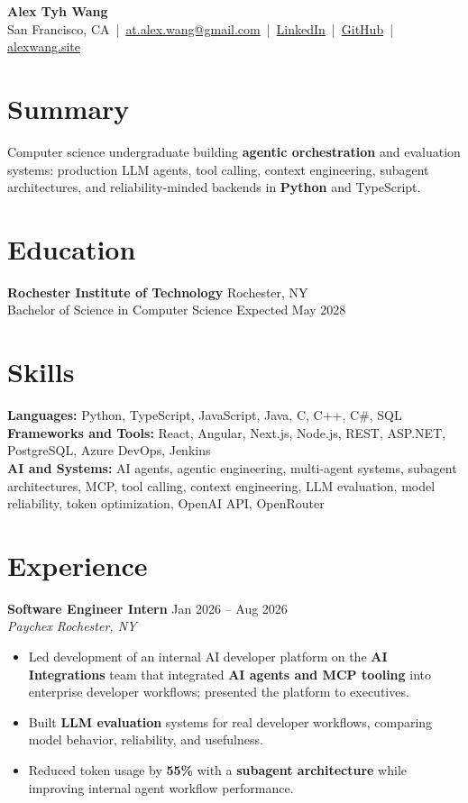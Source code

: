 \documentclass[10pt,letterpaper]{article}
\newif\ifresumeFirstRole
\newcommand{\resumeRole}[4]{%
  \ifresumeFirstRole
    \global\resumeFirstRolefalse
  \else
    \vspace{0pt plus 1fill}%
  \fi
  \textbf{#1} \hfill #2\\
  \textit{#3} \hfill \textit{#4}
}
\begin{document}
\begin{center}
{\Large \textbf{Alex Tyh Wang}}\\
San Francisco, CA \,|\, \href{mailto:at.alex.wang@gmail.com}{at.alex.wang@gmail.com} \,|\, \href{https://www.linkedin.com/in/alex-tyh-wang/}{LinkedIn} \,|\, \href{https://github.com/alextyhwang}{GitHub} \,|\, \href{https://alexwang.site}{alexwang.site}
\end{center}

\section*{Summary}
Computer science undergraduate building \textbf{agentic orchestration} and evaluation systems: production LLM agents, tool calling, context engineering, subagent architectures, and reliability-minded backends in \textbf{Python} and TypeScript.

\section*{Education}
\textbf{Rochester Institute of Technology} \hfill Rochester, NY\\
Bachelor of Science in Computer Science \hfill Expected May 2028

\section*{Skills}
\textbf{Languages:} Python, TypeScript, JavaScript, Java, C, C++, C\#, SQL\\
\textbf{Frameworks and Tools:} React, Angular, Next.js, Node.js, REST, ASP.NET, PostgreSQL, Azure DevOps, Jenkins\\
\textbf{AI and Systems:} AI agents, agentic engineering, multi-agent systems, subagent architectures, MCP, tool calling, context engineering, LLM evaluation, model reliability, token optimization, OpenAI API, OpenRouter

\section*{Experience}
\resumeRole{Software Engineer Intern}{Jan 2026 -- Aug 2026}{Paychex}{Rochester, NY}
\begin{itemize}
  \item Led development of an internal AI developer platform on the \textbf{AI Integrations} team that integrated \textbf{AI agents and MCP tooling} into enterprise developer workflows; presented the platform to executives.
  \item Built \textbf{LLM evaluation} systems for real developer workflows, comparing model behavior, reliability, and usefulness.
  \item Reduced token usage by \textbf{55\%} with a \textbf{subagent architecture} while improving internal agent workflow performance.
\end{itemize}
\end{document}
